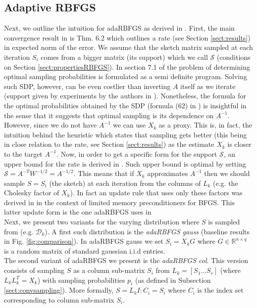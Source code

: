 \documentclass[12pt,conference,compsocconf]{IEEEtran}
\newcommand{\R}{\mathbb{R}}
\begin{document}
\subsection{Adaptive RBFGS}\label{sect:adadef}
Next, we outline the intuition for adaRBFGS as derived in \cite{Gower1}. First, the main convergence result in \cite{Gower1} is Thm. 6.2 which outlines a rate (see Section \ref{sect:results}) in expected norm of the error. We assume that the sketch matrix sampled at each iteration $S_i$ comes from a bigger matrix (its support) which we call $\mathcal{S}$ (conditions on Section \ref{sect:propertiesRBFGS}). In section 7.1 of \cite{Gower1} the problem of determining optimal sampling probabilities is formulated as a semi definite program. Solving such SDP, however, can be even costlier than inverting $A$ itself as we iterate (support given by experiments by the authors in \cite{Gower1}). Nonetheless, the formula for the optimal probabilities obtained by the SDP (formula (62) in \cite{Gower1}) is insightful in the sense that it suggests that optimal sampling is its dependence on $A^{-1}$. However, since we do not have $A^{-1}$ we can use $X_k$ as a proxy. This is, in fact, the intuition behind the heuristic which states that sampling gets better (this being in close relation to the rate, see Section \ref{sect:results}) as the estimate $X_k$ is closer to the target $A^{-1}$. Now, in order to get a specific form for the support $\mathcal{S}$, an upper bound for the rate is derived in \cite{Gower2}. Such upper bound is optimal by setting $\mathcal{S}=A^{-T}W^{-1/2}=A^{-1/2}$. This means that if $X_k$ approximates $A^{-1}$ then we should sample $S=S_i$ (the sketch) at each iteration from the columns of $L_k$ (e.g. the Cholesky factor of $X_k$). In fact an update rule that uses only these factors was derived in \cite{Gratton} in the context of limited memory preconditioners for BFGS. This latter update form is the one adaRBFGS uses in \cite{Gower1}\\
Next, we present two variants for the varying distribution where $S$ is sampled from (e.g. $\mathcal{D}_k$). A first such distribution is the \textit{adaRBFGS gauss} (baseline results in Fig. \ref{fig:comparison}). In adaRBFGS gauss we set $S_i=X_kG$ where $G \in \R^{n\times q}$ is a random matrix of standard gaussian i.i.d entries.\\
The second variant of adaRBFGS we present is the \textit{adaRBFGS col}. This version consists of sampling $S$ as a column sub-matrix $S_i$ from $L_k=[S_1\ldots S_r]$ (where $L_kL_k^T=X_k$) with sampling probabilities $p_i$ (as defined in Subsection \ref{sect:convsampling}). More formally, $S=L_kI{:C_i}=S_i$ where $C_i$ is the index set corresponding to column sub-matrix $S_i$.
\end{document}
